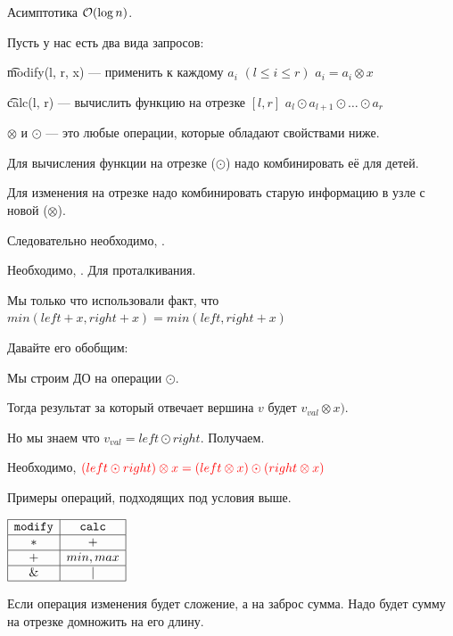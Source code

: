 Асимптотика $\mathcal{O}(\log n)$.


Пусть у нас есть два вида запросов:

\begin{MyList}[0pt]
	\item \t{modify(l, r, x)} --- применить к каждому $a_i$ $(l \le i \le r)$ $a_i = a_i \otimes x$
	\item \t{calc(l, r)} --- вычислить функцию на отрезке $[l, r]$ $a_l \odot a_{l + 1} \odot \ldots \odot a_r$
\end{MyList}

$\otimes$ и $\odot$ — это любые операции, которые обладают свойствами ниже.
\down

Для вычисления функции на отрезке ($\odot$) надо комбинировать её для детей.

Для изменения на отрезке надо комбинировать старую информацию в узле с новой ($\otimes$).

Следовательно необходимо, .
\down

Необходимо, . Для проталкивания.
\down

Мы только что использовали факт, что $min(left + x, right + x) = min(left, right + x)$

Давайте его обобщим:

Мы строим ДО на операции $\odot$.

Тогда результат за который отвечает вершина $v$ будет $v_{val} \otimes x)$.

Но мы знаем что $v_{val} = left \odot right$. Получаем.

Необходимо, ${\color{red}{(left \odot right) \otimes x = (left \otimes x) \odot (right \otimes x)}}$
\down

Примеры операций, подходящих под условия выше.

\begin{center}
$\begin{array}{| c | c |} \hline \texttt{modify} & \texttt{calc} \\ \hline * & + \\ \hline + & min, max \\ \hline \& & | \\ \hline \end{array}$
\end{center}

Если операция изменения будет сложение, а на заброс сумма. Надо будет сумму на отрезке домножить на его длину.

